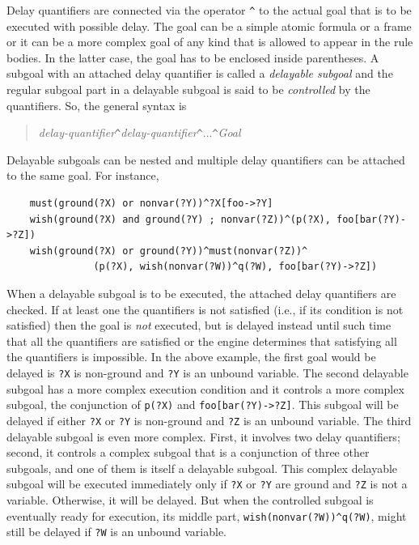 \documentclass[11pt]{article}
\begin{document}
Delay quantifiers are connected via the operator \texttt{\^} to the actual
goal that is to be executed with possible delay. The goal can be a simple
atomic formula or a frame or it can be a more complex goal of any kind that
is allowed to appear in the rule bodies. In the latter case, the goal has
to be enclosed inside parentheses. A subgoal with an attached delay
quantifier is called a \emph{delayable subgoal}
and the regular subgoal part in a delayable subgoal is said to be
\emph{controlled} by the quantifiers.  So, the general syntax is
\begin{quote}
   \emph{delay-quantifier}\texttt{\^}\emph{delay-quantifier}\texttt{\^}...\texttt{\^}\emph{Goal}  
\end{quote}
Delayable subgoals can be
nested and multiple delay quantifiers can be attached to the same goal.
For instance, 
\begin{verbatim}
    must(ground(?X) or nonvar(?Y))^?X[foo->?Y]
    wish(ground(?X) and ground(?Y) ; nonvar(?Z))^(p(?X), foo[bar(?Y)->?Z])
    wish(ground(?X) or ground(?Y))^must(nonvar(?Z))^
               (p(?X), wish(nonvar(?W))^q(?W), foo[bar(?Y)->?Z])
\end{verbatim}
When a delayable subgoal is to be executed, the attached delay quantifiers
are checked. If at least one the quantifiers is not satisfied (i.e., if its
condition is not satisfied) then the goal is \emph{not} executed, but is
delayed instead until such time that all the quantifiers are satisfied or
the engine determines that satisfying all the quantifiers is impossible.
In the above example, the first goal would be delayed is \texttt{?X} is
non-ground and \texttt{?Y} is an unbound variable. The second delayable
subgoal has a more complex execution condition and it controls a more
complex subgoal, the conjunction of \texttt{p(?X)} and
\texttt{foo[bar(?Y)->?Z]}.  This subgoal will be delayed if either
\texttt{?X} or \texttt{?Y} is non-ground and \texttt{?Z} is an unbound
variable. The third delayable subgoal is even more complex. First, it
involves two delay quantifiers; second, it controls a complex subgoal that
is a conjunction of three other subgoals, and one of them is itself a
delayable subgoal.  This complex delayable subgoal will be executed
immediately only if \texttt{?X} or \texttt{?Y} are ground and \texttt{?Z}
is not a variable.  Otherwise, it will be delayed. But when the controlled
subgoal is eventually ready for execution, its middle part,
\texttt{wish(nonvar(?W))\^{}q(?W)}, might still be delayed if \texttt{?W}
is an unbound variable.
\end{document}
